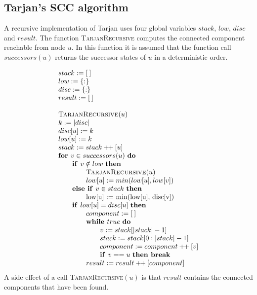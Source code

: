 \documentclass{article}
\newcommand{\concat}{\ensuremath{+\!\!+\:}}
\newcommand{\emptymap}{\ensuremath{\{ : \}}}
\newcommand{\emptylist}{\ensuremath{[\:]}}
\newcommand{\If}{\text{\textbf{if }}}
\newcommand{\Do}{\text{\textbf{do }}}
\newcommand{\Then}{\text{\textbf{then }}}
\newcommand{\Else}{\text{\textbf{else }}}
\newcommand{\For}{\text{\textbf{for }}}
\newcommand{\While}{\text{\textbf{while }}}
\newcommand{\Break}{\text{\textbf{break }}}
\begin{document}
\subsection{Tarjan's SCC algorithm}
A recursive implementation of Tarjan uses four global variables $stack$, $low$, $disc$ and $result$. The function
\textsc{TarjanRecursive} computes the connected component reachable from node $u$. In this function it is assumed that the function call $successors(u)$ returns the successor states of $u$ in a deterministic order.

\[
\begin{tabular}{l}
$stack := \emptylist$ \\
$low := \emptymap$ \\
$disc := \emptymap$ \\
$result := \emptylist$ \\
\\
\textsc{TarjanRecursive}$(u)$ \\
$k := |disc|$ \\
$disc[u] := k$ \\
$low[u] := k$ \\
$stack := stack \concat [u]$ \\
\For $v \in successors(u)$ \Do \\
\qquad \If $v \notin low$ \Then \\
\qquad \qquad \textsc{TarjanRecursive}$(u)$ \\
\qquad \qquad $low[u] := min(low[u], low[v])$ \\
\qquad \Else \If $v \in stack$ \Then \\
\qquad \qquad low[u] := min(low[u], disc[v]) \\
\qquad \If $low[u] = disc[u]$ \Then \\
\qquad \qquad $component := \emptylist$ \\
\qquad \qquad \While $true$ \Do \\
\qquad \qquad \qquad $v := stack[|stack| - 1]$ \\
\qquad \qquad \qquad $stack := stack[0:|stack| - 1]$ \\
\qquad \qquad \qquad $component := component \concat [v]$ \\
\qquad \qquad \qquad \If $v == u$ \Then \Break \\
\qquad \qquad $result := result \concat [component]$ \\
\end{tabular}
\]
A side effect of a call \textsc{TarjanRecursive}$(u)$ is that $result$ contains the connected components that have been found.
\end{document}
